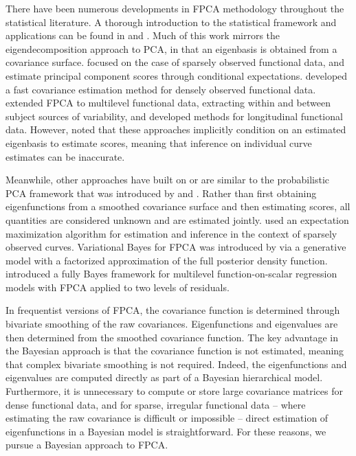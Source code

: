 \documentclass[ba]{imsart}
\numberwithin{equation}{section}
\theoremstyle{plain}
\begin{document}
There have been numerous developments in FPCA methodology throughout the statistical literature.
A thorough introduction to the statistical framework and applications can be found in \citet[Chapter~8]{ramsay05}
and \citet[Section~2]{wang16}. Much of this work mirrors the eigendecomposition approach to PCA, in that an
eigenbasis is obtained from a covariance surface. \citet{yao05} focused on the case of sparsely observed functional
data, and estimate
principal component scores through conditional expectations. \citet{xiao16} developed a fast covariance estimation method for densely observed functional data. \citet{di09} extended FPCA to multilevel functional data, extracting within and
between subject sources of variability, and \citet{greven11} developed methods for longitudinal functional data. However,
\citet{goldsmith13} noted that these approaches implicitly condition on an estimated eigenbasis to estimate scores, meaning that inference on
individual curve estimates can be inaccurate.

Meanwhile, other approaches have built on or are similar to the probabilistic PCA framework that was introduced by \citet{tipping99}
and \citet{bishop99}. Rather than first obtaining eigenfunctions from a smoothed covariance surface and then estimating scores, all quantities are
considered unknown and are estimated jointly.  \citet{james00} used an expectation maximization algorithm for estimation and inference in
the context of sparsely observed curves. Variational Bayes for FPCA was introduced by \citet{vanderlinde08} via a generative model with a factorized
approximation of the full posterior density function. \citet{Goldsmith15} introduced a fully Bayes framework for multilevel function-on-scalar
regression models with FPCA applied to two levels of residuals.

In frequentist versions of FPCA, the covariance function is determined through bivariate smoothing of the raw
covariances. Eigenfunctions and eigenvalues are then determined from the smoothed covariance function.
The key advantage in the Bayesian approach is that the covariance function is not estimated, meaning that
complex bivariate smoothing is not required. Indeed, the eigenfunctions and eigenvalues are computed directly
as part of a Bayesian hierarchical model. Furthermore, it is unnecessary to compute or store large covariance matrices for dense functional data, and for sparse, irregular functional data -- where estimating the raw covariance is difficult or impossible -- direct estimation of eigenfunctions in a Bayesian model is straightforward. For these reasons, we pursue a Bayesian approach to FPCA.
\end{document}
